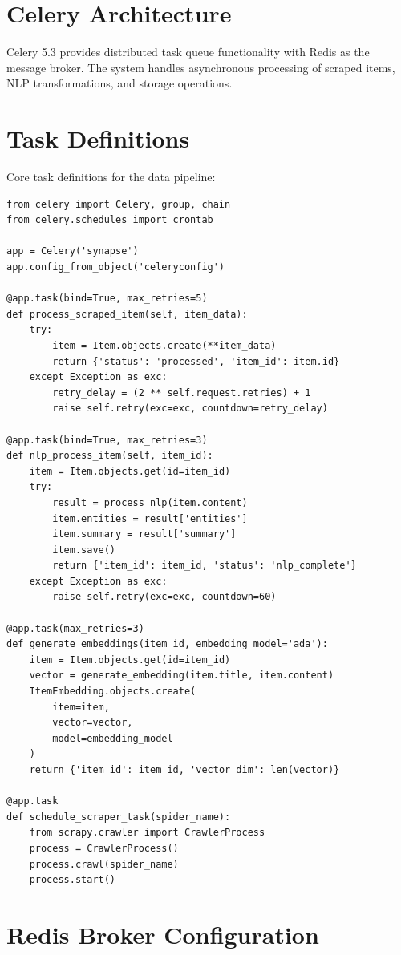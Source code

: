 \documentclass[12pt,a4paper]{report}
\begin{document}
\section{Celery Architecture}

Celery 5.3 provides distributed task queue functionality with Redis as the message broker. The system handles asynchronous processing of scraped items, NLP transformations, and storage operations.

\section{Task Definitions}

Core task definitions for the data pipeline:

\begin{lstlisting}
from celery import Celery, group, chain
from celery.schedules import crontab

app = Celery('synapse')
app.config_from_object('celeryconfig')

@app.task(bind=True, max_retries=5)
def process_scraped_item(self, item_data):
    try:
        item = Item.objects.create(**item_data)
        return {'status': 'processed', 'item_id': item.id}
    except Exception as exc:
        retry_delay = (2 ** self.request.retries) + 1
        raise self.retry(exc=exc, countdown=retry_delay)

@app.task(bind=True, max_retries=3)
def nlp_process_item(self, item_id):
    item = Item.objects.get(id=item_id)
    try:
        result = process_nlp(item.content)
        item.entities = result['entities']
        item.summary = result['summary']
        item.save()
        return {'item_id': item_id, 'status': 'nlp_complete'}
    except Exception as exc:
        raise self.retry(exc=exc, countdown=60)

@app.task(max_retries=3)
def generate_embeddings(item_id, embedding_model='ada'):
    item = Item.objects.get(id=item_id)
    vector = generate_embedding(item.title, item.content)
    ItemEmbedding.objects.create(
        item=item,
        vector=vector,
        model=embedding_model
    )
    return {'item_id': item_id, 'vector_dim': len(vector)}

@app.task
def schedule_scraper_task(spider_name):
    from scrapy.crawler import CrawlerProcess
    process = CrawlerProcess()
    process.crawl(spider_name)
    process.start()
\end{lstlisting}

\section{Redis Broker Configuration}
\end{document}
